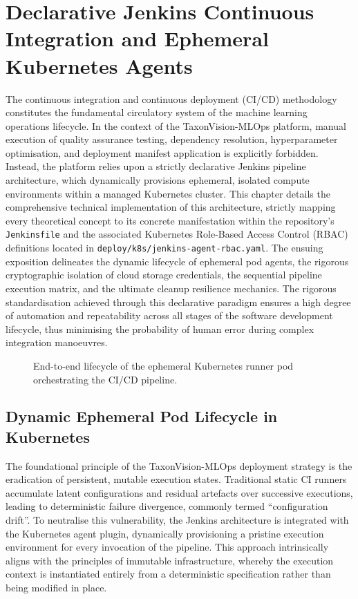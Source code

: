 \chapter{Declarative Jenkins Continuous Integration and Ephemeral Kubernetes Agents}
\label{ch:declarative_jenkins_ci}

The continuous integration and continuous deployment (CI/CD) methodology constitutes the fundamental circulatory system of the machine learning operations lifecycle. In the context of the TaxonVision-MLOps platform, manual execution of quality assurance testing, dependency resolution, hyperparameter optimisation, and deployment manifest application is explicitly forbidden. Instead, the platform relies upon a strictly declarative Jenkins pipeline architecture, which dynamically provisions ephemeral, isolated compute environments within a managed Kubernetes cluster. This chapter details the comprehensive technical implementation of this architecture, strictly mapping every theoretical concept to its concrete manifestation within the repository's \texttt{Jenkinsfile} and the associated Kubernetes Role-Based Access Control (RBAC) definitions located in \texttt{deploy/k8s/jenkins-agent-rbac.yaml}. The ensuing exposition delineates the dynamic lifecycle of ephemeral pod agents, the rigorous cryptographic isolation of cloud storage credentials, the sequential pipeline execution matrix, and the ultimate cleanup resilience mechanics. The rigorous standardisation achieved through this declarative paradigm ensures a high degree of automation and repeatability across all stages of the software development lifecycle, thus minimising the probability of human error during complex integration manoeuvres.

\begin{figure}[htbp]
    \centering
    
    \caption{End-to-end lifecycle of the ephemeral Kubernetes runner pod orchestrating the CI/CD pipeline.}
    \label{fig:jenkins_ephemeral_agent_lifecycle}
\end{figure}

\section{Dynamic Ephemeral Pod Lifecycle in Kubernetes}
\label{sec:dynamic_ephemeral_pod}

The foundational principle of the TaxonVision-MLOps deployment strategy is the eradication of persistent, mutable execution states. Traditional static CI runners accumulate latent configurations and residual artefacts over successive executions, leading to deterministic failure divergence, commonly termed ``configuration drift''. To neutralise this vulnerability, the Jenkins architecture is integrated with the Kubernetes agent plugin, dynamically provisioning a pristine execution environment for every invocation of the pipeline. This approach intrinsically aligns with the principles of immutable infrastructure, whereby the execution context is instantiated entirely from a deterministic specification rather than being modified in place.

